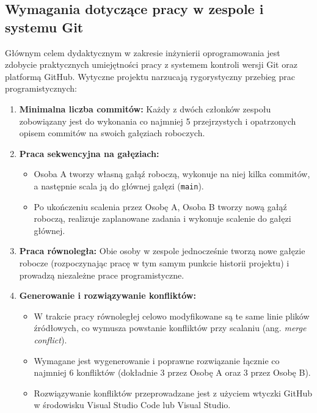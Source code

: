 \subsection{Wymagania dotyczące pracy w zespole i systemu Git}

\hspace{0.60cm}
Głównym celem dydaktycznym w zakresie inżynierii oprogramowania jest zdobycie praktycznych umiejętności pracy z systemem kontroli wersji Git oraz platformą GitHub. Wytyczne projektu narzucają rygorystyczny przebieg prac programistycznych:

\begin{enumerate}
    \item \textbf{Minimalna liczba commitów:} Każdy z dwóch członków zespołu zobowiązany jest do wykonania co najmniej 5 przejrzystych i opatrzonych opisem commitów na swoich gałęziach roboczych.
    \item \textbf{Praca sekwencyjna na gałęziach:}
    \begin{itemize}
        \item Osoba A tworzy własną gałąź roboczą, wykonuje na niej kilka commitów, a następnie scala ją do głównej gałęzi (\texttt{main}).
        \item Po ukończeniu scalenia przez Osobę A, Osoba B tworzy nową gałąź roboczą, realizuje zaplanowane zadania i wykonuje scalenie do gałęzi głównej.
    \end{itemize}
    \item \textbf{Praca równoległa:} Obie osoby w zespole jednocześnie tworzą nowe gałęzie robocze (rozpoczynając pracę w tym samym punkcie historii projektu) i prowadzą niezależne prace programistyczne.
    \item \textbf{Generowanie i rozwiązywanie konfliktów:}
    \begin{itemize}
        \item W trakcie pracy równoległej celowo modyfikowane są te same linie plików źródłowych, co wymusza powstanie konfliktów przy scalaniu (ang. \textit{merge conflict}).
        \item Wymagane jest wygenerowanie i poprawne rozwiązanie łącznie co najmniej 6 konfliktów (dokładnie 3 przez Osobę A oraz 3 przez Osobę B).
        \item Rozwiązywanie konfliktów przeprowadzane jest z użyciem wtyczki GitHub w środowisku Visual Studio Code lub Visual Studio.
    \end{itemize}
\end{enumerate}

